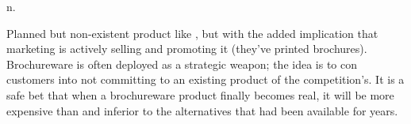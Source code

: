  n.

Planned but non-existent product like , but with the added
implication that marketing is actively selling and promoting it (they've printed
brochures). Brochureware is often deployed as a strategic weapon; the idea is to
con customers into not committing to an existing product of the competition's.
It is a safe bet that when a brochureware product finally becomes real, it will
be more expensive than and inferior to the alternatives that had been available
for years.

